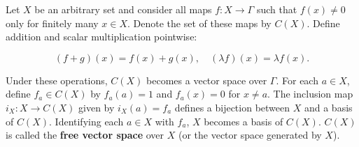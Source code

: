 Let $X$ be an arbitrary set and consider all maps $f: X \to \Gamma$ such that $f(x) \neq 0$ only for finitely many $x \in X$. Denote the set of these maps by $C(X)$. Define addition and scalar multiplication pointwise:

$$(f + g)(x) = f(x) + g(x), \quad (\lambda f)(x) = \lambda f(x).$$

Under these operations, $C(X)$ becomes a vector space over $\Gamma$. For each $a \in X$, define $f_a \in C(X)$ by $f_a(a) = 1$ and $f_a(x) = 0$ for $x \neq a$. The inclusion map $i_X: X \to C(X)$ given by $i_X(a) = f_a$ defines a bijection between $X$ and a basis of $C(X)$. Identifying each $a \in X$ with $f_a$, $X$ becomes a basis of $C(X)$. $C(X)$ is called the \textbf{free vector space} over $X$ (or the vector space generated by $X$).
